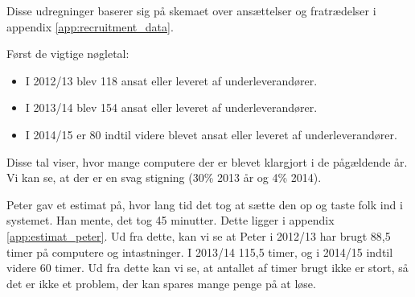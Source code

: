 \label{app:cost_benefit_analysis}
Disse udregninger baserer sig på skemaet over ansættelser og fratrædelser i appendix \ref{app:recruitment_data}.

Først de vigtige nøgletal:
\begin{itemize}
\item I 2012/13 blev 118 ansat eller leveret af underleverandører.
\item I 2013/14 blev 154 ansat eller leveret af underleverandører.
\item I 2014/15 er 80 indtil videre blevet ansat eller leveret af underleverandører.
\end{itemize}
Disse tal viser, hvor mange computere der er blevet klargjort i de pågældende år.
Vi kan se, at der er en svag stigning (30\% 2013 år og 4\% 2014).

Peter gav et estimat på, hvor lang tid det tog at sætte den op og taste folk ind i systemet.
Han mente, det tog 45 minutter.
Dette ligger i appendix \ref{app:estimat_peter}.
Ud fra dette, kan vi se at Peter i 2012/13 har brugt 88,5 timer på computere og intastninger.
I 2013/14 115,5 timer, og i 2014/15 indtil videre 60 timer.
Ud fra dette kan vi se, at antallet af timer brugt ikke er stort, så det er ikke et problem, der kan spares mange penge på at løse.





